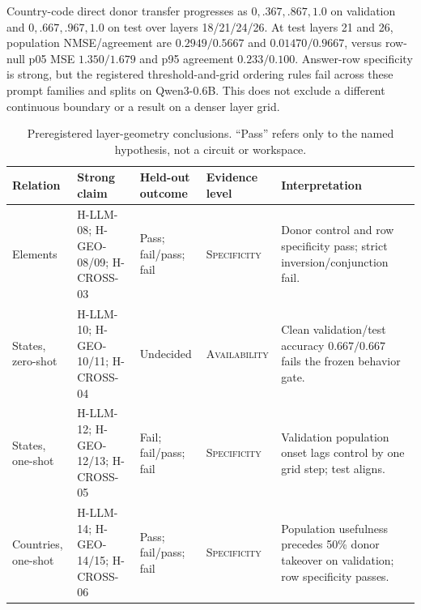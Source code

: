 \documentclass[10pt]{article}
\newcommand{\level}[1]{{\scriptsize\textsc{#1}}}
\begin{document}
Country-code direct donor transfer progresses as
$0,.367,.867,1.0$ on validation and $0,.667,.967,1.0$ on test over layers
18/21/24/26.  At test layers 21 and 26, population NMSE/agreement are
$0.2949/0.5667$ and $0.01470/0.9667$, versus row-null p05 MSE
$1.350/1.679$ and p95 agreement $0.233/0.100$.  Answer-row specificity is
strong, but the registered threshold-and-grid ordering rules fail across these
prompt families and splits on Qwen3-0.6B.  This does not exclude a different
continuous boundary or a result on a denser layer grid.

\begin{table}[t]
\centering
\small
\caption{Preregistered layer-geometry conclusions.  ``Pass'' refers only to
the named hypothesis, not a circuit or workspace.}
\label{tab:layer}
\begin{tabularx}{\textwidth}{@{}p{2.8cm}p{3.0cm}p{2.5cm}p{2.1cm}Y@{}}
\toprule
Relation & Strong claim & Held-out outcome & Evidence level & Interpretation \\
\midrule
Elements & H-LLM-08; H-GEO-08/09; H-CROSS-03 & Pass; fail/pass; fail & \level{Specificity} & Donor control and row specificity pass; strict inversion/conjunction fail. \\
States, zero-shot & H-LLM-10; H-GEO-10/11; H-CROSS-04 & Undecided & \level{Availability} & Clean validation/test accuracy $0.667/0.667$ fails the frozen behavior gate. \\
States, one-shot & H-LLM-12; H-GEO-12/13; H-CROSS-05 & Fail; fail/pass; fail & \level{Specificity} & Validation population onset lags control by one grid step; test aligns. \\
Countries, one-shot & H-LLM-14; H-GEO-14/15; H-CROSS-06 & Pass; fail/pass; fail & \level{Specificity} & Population usefulness precedes 50\% donor takeover on validation; row specificity passes. \\
\bottomrule
\end{tabularx}
\end{table}
\end{document}
